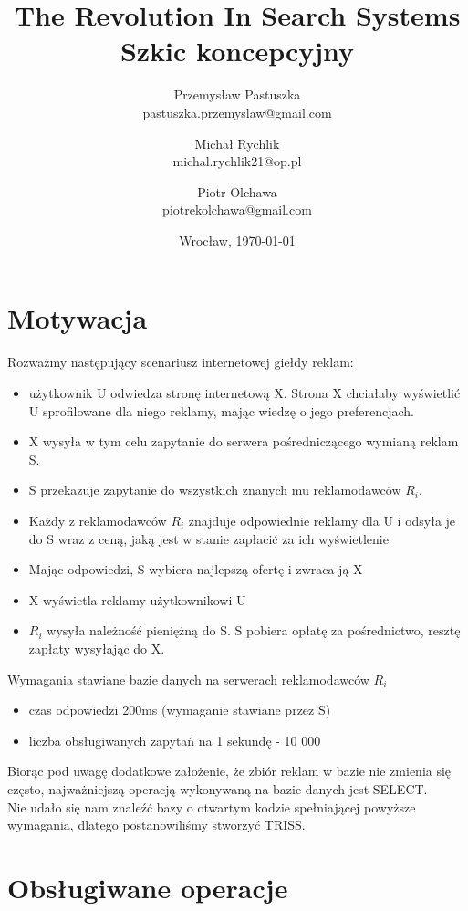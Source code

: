 \documentclass[11pt]{article}
\title{\LARGE \textbf{ The Revolution In Search Systems}\\
                               Szkic koncepcyjny
}
\author{Przemysław Pastuszka\\ pastuszka.przemyslaw@gmail.com \and
        Michał Rychlik\\ michal.rychlik21@op.pl \and
        Piotr Olchawa\\ piotrekolchawa@gmail.com}
\date{Wrocław, \today}
\begin{document}
    \lstset{language=C++}
    \maketitle
    \thispagestyle{empty}
    \tableofcontents
    \newpage

    \section{Motywacja}
        Rozważmy następujący scenariusz internetowej giełdy reklam:
        \begin{itemize}
            \item użytkownik U odwiedza stronę internetową X. Strona X chciałaby wyświetlić U sprofilowane dla niego reklamy, mając wiedzę o jego preferencjach.
            \item X wysyła w tym celu zapytanie do serwera pośredniczącego wymianą reklam S.
            \item S przekazuje zapytanie do wszystkich znanych mu reklamodawców $R_{i}$.
            \item Każdy z reklamodawców $R_{i}$ znajduje odpowiednie reklamy dla U i odsyła je do S wraz z ceną, jaką jest w stanie zapłacić za ich wyświetlenie
            \item Mając odpowiedzi, S wybiera najlepszą ofertę i zwraca ją X
            \item X wyświetla reklamy użytkownikowi U
            \item $R_{i}$ wysyła należność pieniężną do S. S pobiera opłatę za pośrednictwo, resztę zapłaty wysyłając do X.
        \end{itemize}
        Wymagania stawiane bazie danych na serwerach reklamodawców $R_{i}$
        \begin{itemize}
            \item czas odpowiedzi 200ms (wymaganie stawiane przez S)
            \item liczba obsługiwanych zapytań na 1 sekundę - 10 000
        \end{itemize}
        Biorąc pod uwagę dodatkowe założenie, że zbiór reklam w bazie nie zmienia się często, najważniejszą operacją wykonywaną na bazie danych jest SELECT.\\
        Nie udało się nam znaleźć bazy o otwartym kodzie spełniającej powyższe wymagania, dlatego postanowiliśmy stworzyć TRISS.
    \section{Obsługiwane operacje}
\end{document}
